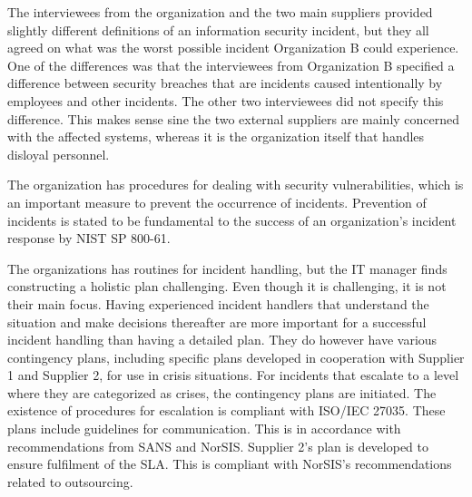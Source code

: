 The interviewees from the organization and the two main suppliers provided slightly different definitions of an information security incident, but they all agreed on what was the worst possible incident Organization B could experience. One of the differences was that the interviewees from Organization B specified a difference between security breaches that are incidents caused intentionally by employees and other incidents. The other two interviewees did not specify this difference. This makes sense sine the two external suppliers are mainly concerned with the affected systems, whereas it is the organization itself that handles disloyal personnel.

The organization has procedures for dealing with security vulnerabilities, which is an important measure to prevent the occurrence of incidents. Prevention of incidents is stated to be fundamental to the success of an organization's incident response by NIST SP 800-61.

The organizations has routines for incident handling, but the IT manager finds constructing a holistic plan challenging. Even though it is challenging, it is not their main focus. Having experienced incident handlers that understand the situation and make decisions thereafter are more important for a successful incident handling than having a detailed plan. They do however have various contingency plans, including specific plans developed in cooperation with Supplier 1 and Supplier 2, for use in crisis situations. For incidents that escalate to a level where they are categorized as crises, the contingency plans are initiated. The existence of procedures for escalation is compliant with ISO/IEC 27035. These plans include guidelines for communication. This is in accordance with recommendations from SANS and NorSIS. Supplier 2's plan is developed to ensure fulfilment of the \ac{SLA}. This is compliant with NorSIS's recommendations related to outsourcing.

